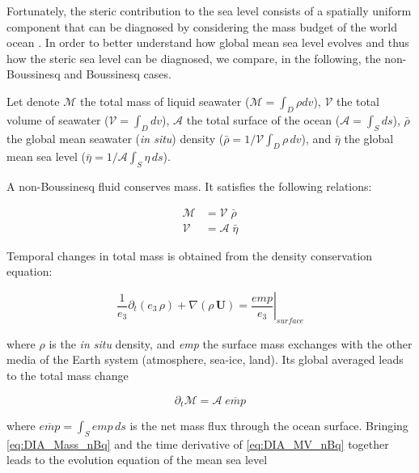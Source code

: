 \documentclass[../main/NEMO_manual]{subfiles}
\begin{document}
Fortunately, the steric contribution to the sea level consists of a spatially uniform component that
can be diagnosed by considering the mass budget of the world ocean \citep{greatbatch_JGR94}.
In order to better understand how global mean sea level evolves and thus how the steric sea level can be diagnosed,
we compare, in the following, the non-Boussinesq and Boussinesq cases.

Let denote
$\mathcal{M}$ the total mass    of liquid seawater ($\mathcal{M} = \int_D \rho dv$),
$\mathcal{V}$ the total volume  of        seawater      ($\mathcal{V} = \int_D dv$),
$\mathcal{A}$ the total surface of       the ocean      ($\mathcal{A} = \int_S ds$),
$\bar{\rho}$ the global mean  seawater (\textit{in situ}) density
($\bar{\rho} = 1/\mathcal{V} \int_D \rho \,dv$), and
$\bar{\eta}$ the global mean sea level
($\bar{\eta} = 1/\mathcal{A} \int_S \eta \,ds$).

A non-Boussinesq fluid conserves mass. It satisfies the following relations:

\begin{equation}
  \begin{split}
    \mathcal{M} &=  \mathcal{V}  \;\bar{\rho} \\
    \mathcal{V} &=  \mathcal{A}  \;\bar{\eta}
  \end{split}
  \label{eq:DIA_MV_nBq}
\end{equation}

Temporal changes in total mass is obtained from the density conservation equation:

\begin{equation}
  \frac{1}{e_3} \partial_t ( e_3\,\rho) + \nabla( \rho \, \textbf{U} )
  = \left. \frac{\textit{emp}}{e_3}\right|_\textit{surface}
  \label{eq:DIA_Co_nBq}
\end{equation}

where $\rho$ is the \textit{in situ} density, and \textit{emp} the surface mass exchanges with the other media of
the Earth system (atmosphere, sea-ice, land).
Its global averaged leads to the total mass change

\begin{equation}
  \partial_t \mathcal{M} = \mathcal{A} \;\overline{\textit{emp}}
  \label{eq:DIA_Mass_nBq}
\end{equation}

where $\overline{\textit{emp}} = \int_S \textit{emp}\,ds$ is the net mass flux through the ocean surface.
Bringing \autoref{eq:DIA_Mass_nBq} and the time derivative of \autoref{eq:DIA_MV_nBq} together leads to
the evolution equation of the mean sea level
\end{document}

